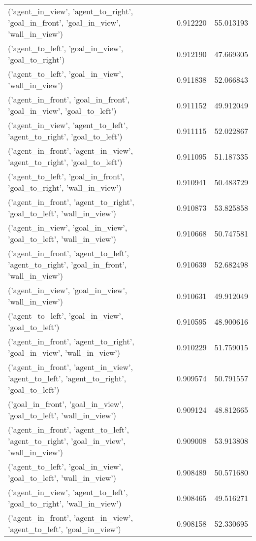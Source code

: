 \begin{tabular}{lrr}
('agent\_in\_view', 'agent\_to\_right', 'goal\_in\_front', 'goal\_in\_view', 'wall\_in\_view') & 0.912220 & 55.013193 \\
('agent\_to\_left', 'goal\_in\_view', 'goal\_to\_right') & 0.912190 & 47.669305 \\
('agent\_to\_left', 'goal\_in\_view', 'wall\_in\_view') & 0.911838 & 52.066843 \\
('agent\_in\_front', 'goal\_in\_front', 'goal\_in\_view', 'goal\_to\_left') & 0.911152 & 49.912049 \\
('agent\_in\_view', 'agent\_to\_left', 'agent\_to\_right', 'goal\_to\_left') & 0.911115 & 52.022867 \\
('agent\_in\_front', 'agent\_in\_view', 'agent\_to\_right', 'goal\_to\_left') & 0.911095 & 51.187335 \\
('agent\_to\_left', 'goal\_in\_front', 'goal\_to\_right', 'wall\_in\_view') & 0.910941 & 50.483729 \\
('agent\_in\_front', 'agent\_to\_right', 'goal\_to\_left', 'wall\_in\_view') & 0.910873 & 53.825858 \\
('agent\_in\_view', 'goal\_in\_view', 'goal\_to\_left', 'wall\_in\_view') & 0.910668 & 50.747581 \\
('agent\_in\_front', 'agent\_to\_left', 'agent\_to\_right', 'goal\_in\_front', 'wall\_in\_view') & 0.910639 & 52.682498 \\
('agent\_in\_view', 'goal\_in\_view', 'wall\_in\_view') & 0.910631 & 49.912049 \\
('agent\_to\_left', 'goal\_in\_view', 'goal\_to\_left') & 0.910595 & 48.900616 \\
('agent\_in\_front', 'agent\_to\_right', 'goal\_in\_view', 'wall\_in\_view') & 0.910229 & 51.759015 \\
('agent\_in\_front', 'agent\_in\_view', 'agent\_to\_left', 'agent\_to\_right', 'goal\_to\_left') & 0.909574 & 50.791557 \\
('goal\_in\_front', 'goal\_in\_view', 'goal\_to\_left', 'wall\_in\_view') & 0.909124 & 48.812665 \\
('agent\_in\_front', 'agent\_to\_left', 'agent\_to\_right', 'goal\_in\_view', 'wall\_in\_view') & 0.909008 & 53.913808 \\
('agent\_to\_left', 'goal\_in\_view', 'goal\_to\_left', 'wall\_in\_view') & 0.908489 & 50.571680 \\
('agent\_in\_view', 'agent\_to\_left', 'goal\_to\_right', 'wall\_in\_view') & 0.908465 & 49.516271 \\
('agent\_in\_front', 'agent\_in\_view', 'agent\_to\_left', 'goal\_in\_view') & 0.908158 & 52.330695 \\

\end{tabular}
